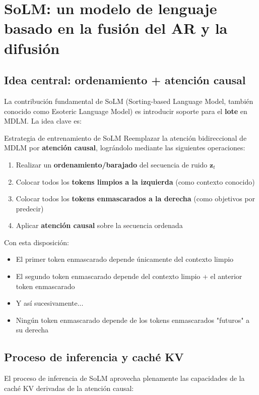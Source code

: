 \section{SoLM: un modelo de lenguaje basado en la fusión del AR y la difusión}

\subsection{Idea central: ordenamiento + atención causal}

La contribución fundamental de SoLM (Sorting-based Language Model, también conocido como Esoteric Language Model) es introducir soporte para el \textbf{lote} en MDLM. La idea clave es:

\begin{importantbox}{Estrategia de entrenamiento de SoLM}
Reemplazar la atención bidireccional de MDLM por \textbf{atención causal}, lográndolo mediante las siguientes operaciones:
\begin{enumerate}
    \item Realizar un \textbf{ordenamiento/barajado} del secuencia de ruido $\mathbf{z}_t$
    \item Colocar todos los \textbf{tokens limpios a la izquierda} (como contexto conocido)
    \item Colocar todos los \textbf{tokens enmascarados a la derecha} (como objetivos por predecir)
    \item Aplicar \textbf{atención causal} sobre la secuencia ordenada
\end{enumerate}
\end{importantbox}

Con esta disposición:
\begin{itemize}
    \item El primer token enmascarado depende únicamente del contexto limpio
    \item El segundo token enmascarado depende del contexto limpio + el anterior token enmascarado
    \item Y así sucesivamente...
    \item Ningún token enmascarado depende de los tokens enmascarados "futuros" a su derecha
\end{itemize}

\subsection{Proceso de inferencia y caché KV}

El proceso de inferencia de SoLM aprovecha plenamente las capacidades de la caché KV derivadas de la atención causal:

